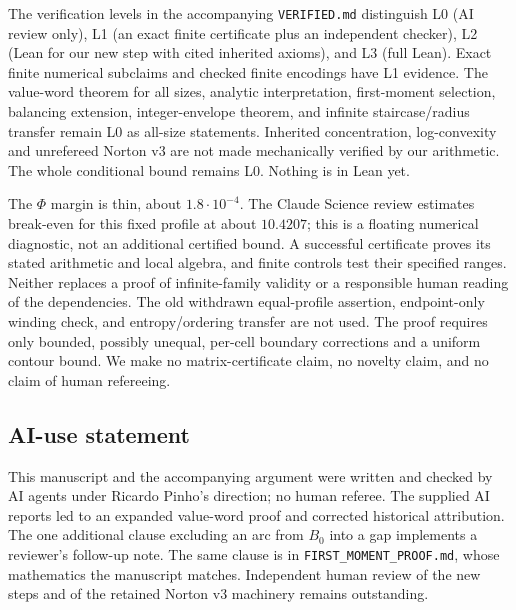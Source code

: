 \documentclass[11pt]{amsart}
\numberwithin{equation}{section}
\theoremstyle{remark}\newtheorem{remark}[theorem]{Remark}
\begin{document}
The verification levels in the accompanying \texttt{VERIFIED.md} distinguish L0 (AI review only), L1 (an exact finite certificate plus an independent checker), L2 (Lean for our new step with cited inherited axioms), and L3 (full Lean). Exact finite numerical subclaims and checked finite encodings have L1 evidence. The value-word theorem for all sizes, analytic interpretation, first-moment selection, balancing extension, integer-envelope theorem, and infinite staircase/radius transfer remain L0 as all-size statements. Inherited concentration, log-convexity and unrefereed Norton v3 are not made mechanically verified by our arithmetic. The whole conditional bound remains L0. Nothing is in Lean yet.

The $\Phi$ margin is thin, about $1.8\cdot10^{-4}$. The Claude Science review estimates break-even for this fixed profile at about $10.4207$; this is a floating numerical diagnostic, not an additional certified bound. A successful certificate proves its stated arithmetic and local algebra, and finite controls test their specified ranges. Neither replaces a proof of infinite-family validity or a responsible human reading of the dependencies. The old withdrawn equal-profile assertion, endpoint-only winding check, and entropy/ordering transfer are not used. The proof requires only bounded, possibly unequal, per-cell boundary corrections and a uniform contour bound. We make no matrix-certificate claim, no novelty claim, and no claim of human refereeing.

\subsection*{AI-use statement}
This manuscript and the accompanying argument were written and checked by AI agents under Ricardo Pinho's direction; no human referee. The supplied AI reports led to an expanded value-word proof and corrected historical attribution. The one additional clause excluding an arc from $B_0$ into a gap implements a reviewer's follow-up note. The same clause is in \texttt{FIRST\_MOMENT\_PROOF.md}, whose mathematics the manuscript matches. Independent human review of the new steps and of the retained Norton v3 machinery remains outstanding.
\end{document}

